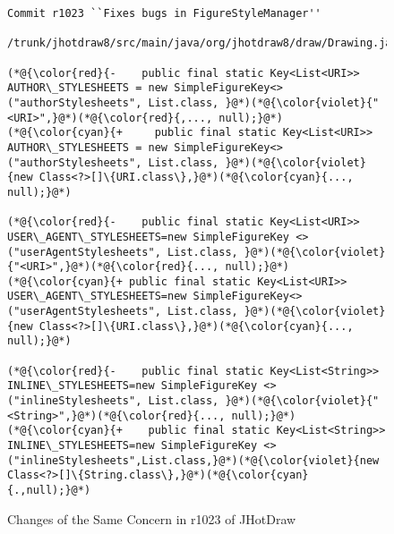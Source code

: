 \begin{figure}[t]
	\centering
	\begin{lstlisting}[]
  Commit r1023 ``Fixes bugs in FigureStyleManager''
  /trunk/jhotdraw8/src/main/java/org/jhotdraw8/draw/Drawing.java
   
(*@{\color{red}{-    public final static Key<List<URI>> AUTHOR\_STYLESHEETS = new SimpleFigureKey<> ("authorStylesheets", List.class, }@*)(*@{\color{violet}{"<URI>",}@*)(*@{\color{red}{,..., null);}@*)
(*@{\color{cyan}{+     public final static Key<List<URI>> AUTHOR\_STYLESHEETS = new SimpleFigureKey<> ("authorStylesheets", List.class, }@*)(*@{\color{violet}{new Class<?>[]\{URI.class\},}@*)(*@{\color{cyan}{..., null);}@*)

(*@{\color{red}{-    public final static Key<List<URI>> USER\_AGENT\_STYLESHEETS=new SimpleFigureKey <>("userAgentStylesheets", List.class, }@*)(*@{\color{violet}{"<URI>",}@*)(*@{\color{red}{..., null);}@*)
(*@{\color{cyan}{+ public final static Key<List<URI>> USER\_AGENT\_STYLESHEETS=new SimpleFigureKey<> ("userAgentStylesheets", List.class, }@*)(*@{\color{violet}{new Class<?>[]\{URI.class\},}@*)(*@{\color{cyan}{..., null);}@*)

(*@{\color{red}{-    public final static Key<List<String>> INLINE\_STYLESHEETS=new SimpleFigureKey <>("inlineStylesheets", List.class, }@*)(*@{\color{violet}{"<String>",}@*)(*@{\color{red}{..., null);}@*)
(*@{\color{cyan}{+    public final static Key<List<String>> INLINE\_STYLESHEETS=new SimpleFigureKey <>("inlineStylesheets",List.class,}@*)(*@{\color{violet}{new Class<?>[]\{String.class\},}@*)(*@{\color{cyan}{.,null);}@*)
	\end{lstlisting}
        \vspace{-15pt}
        \caption{Changes of the Same Concern in r1023 of JHotDraw}
        \vspace{-6pt}
        \label{fig:history}
\end{figure}


